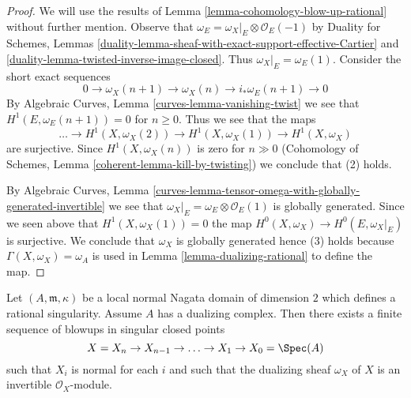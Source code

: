 \begin{proof}
We will use the results of Lemma \ref{lemma-cohomology-blow-up-rational}
without further mention. Observe that
$\omega_E = \omega_X|_E \otimes \mathcal{O}_E(-1)$
by Duality for Schemes, Lemmas
\ref{duality-lemma-sheaf-with-exact-support-effective-Cartier} and
\ref{duality-lemma-twisted-inverse-image-closed}. Thus
$\omega_X|_E = \omega_E(1)$. Consider the short exact sequences
$$
0 \to \omega_X(n + 1) \to \omega_X(n) \to i_*\omega_E(n + 1) \to 0
$$
By Algebraic Curves, Lemma \ref{curves-lemma-vanishing-twist}
we see that $H^1(E, \omega_E(n + 1)) = 0$ for $n \geq 0$.
Thus we see that the maps
$$
\ldots \to H^1(X, \omega_X(2)) \to H^1(X, \omega_X(1)) \to H^1(X, \omega_X)
$$
are surjective. Since $H^1(X, \omega_X(n))$ is zero for $n \gg 0$
(Cohomology of Schemes, Lemma \ref{coherent-lemma-kill-by-twisting})
we conclude that (2) holds.

\medskip\noindent
By Algebraic Curves, Lemma
\ref{curves-lemma-tensor-omega-with-globally-generated-invertible}
we see that $\omega_X|_E = \omega_E \otimes \mathcal{O}_E(1)$
is globally generated. Since we seen above that
$H^1(X, \omega_X(1)) = 0$ the map $H^0(X, \omega_X) \to H^0(E, \omega_X|_E)$
is surjective. We conclude that $\omega_X$ is globally generated
hence (3) holds because $\Gamma(X, \omega_X) = \omega_A$ is used
in Lemma \ref{lemma-dualizing-rational} to define the map.
\end{proof}

\begin{lemma}
\label{lemma-rational-to-gorenstein}
Let $(A, \mathfrak m, \kappa)$ be a local normal Nagata domain of
dimension $2$ which defines a rational singularity. Assume $A$ has
a dualizing complex. Then there exists a finite sequence of blowups in
singular closed points
$$
X = X_n \to X_{n - 1} \to \ldots \to X_1 \to X_0 = \Spec(A)
$$
such that $X_i$ is normal for each $i$ and such that
the dualizing sheaf $\omega_X$ of $X$ is an invertible
$\mathcal{O}_X$-module.
\end{lemma}


